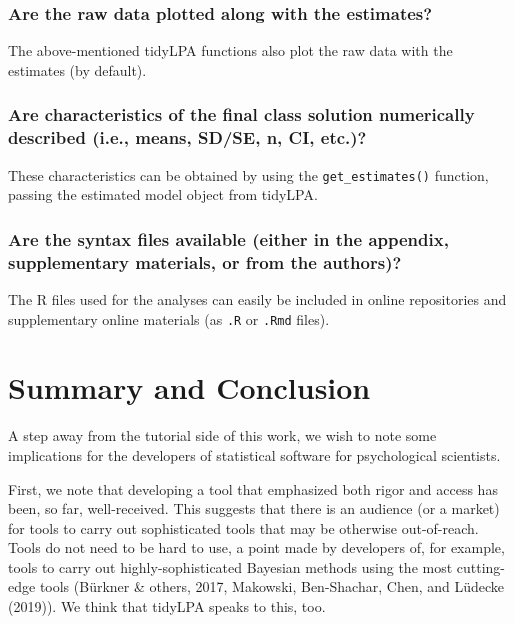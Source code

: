 \documentclass[man]{apa6}
\begin{document}
\hypertarget{are-the-raw-data-plotted-along-with-the-estimates}{%
\subsubsection{Are the raw data plotted along with the estimates?}\label{are-the-raw-data-plotted-along-with-the-estimates}}

The above-mentioned tidyLPA functions also plot the raw data with the estimates (by default).

\hypertarget{are-characteristics-of-the-final-class-solution-numerically-described-i.e.-means-sdse-n-ci-etc.}{%
\subsubsection{Are characteristics of the final class solution numerically described (i.e., means, SD/SE, n, CI, etc.)?}\label{are-characteristics-of-the-final-class-solution-numerically-described-i.e.-means-sdse-n-ci-etc.}}

These characteristics can be obtained by using the \texttt{get\_estimates()} function, passing the estimated model object from tidyLPA.

\hypertarget{are-the-syntax-files-available-either-in-the-appendix-supplementary-materials-or-from-the-authors}{%
\subsubsection{Are the syntax files available (either in the appendix, supplementary materials, or from the authors)?}\label{are-the-syntax-files-available-either-in-the-appendix-supplementary-materials-or-from-the-authors}}

The R files used for the analyses can easily be included in online repositories and supplementary online materials (as \texttt{.R} or \texttt{.Rmd} files).

\hypertarget{summary-and-conclusion}{%
\section{Summary and Conclusion}\label{summary-and-conclusion}}

A step away from the tutorial side of this work, we wish to note some
implications for the developers of statistical software for psychological
scientists.

First, we note that developing a tool that emphasized both rigor and access has
been, so far, well-received. This suggests that there is an audience (or a
market) for tools to carry out sophisticated tools that may be otherwise
out-of-reach. Tools do not need to be hard to use, a point made by developers
of, for example, tools to carry out highly-sophisticated Bayesian methods using
the most cutting-edge tools (Bürkner \& others, 2017, Makowski, Ben-Shachar, Chen, and Lüdecke (2019)). We think that
tidyLPA speaks to this, too.
\end{document}
